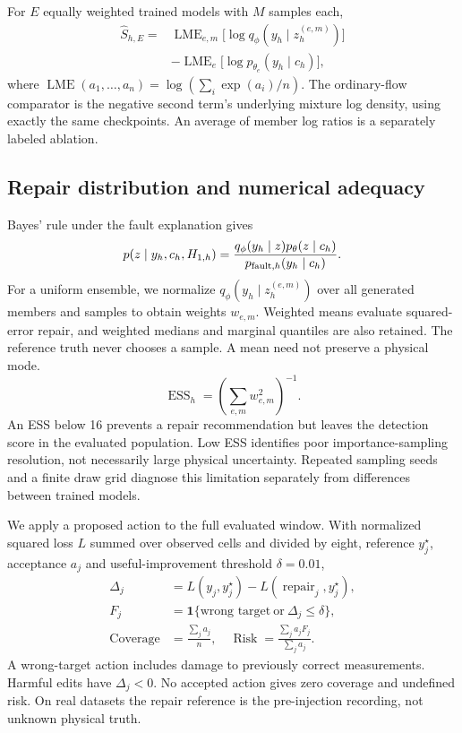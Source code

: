 \documentclass[conference]{IEEEtran}
\newcommand{\1}{\mathbf{1}}
\newcommand{\LME}{\operatorname{LME}}
\begin{document}
For $E$ equally weighted trained models with $M$ samples each,
\begin{equation}
\begin{split}
 \widehat S_{h,E}={}&\LME_{e,m}\bigl[\log q_\phi(y_h\mid z_h^{(e,m)})\bigr]\\
 &-\LME_e\bigl[\log p_{\theta_e}(y_h\mid c_h)\bigr],
\end{split}
\end{equation}
where $\LME(a_1,\ldots,a_n)=\log(\sum_i\exp(a_i)/n)$. The ordinary-flow comparator is the negative second term's underlying mixture log density, using exactly the same checkpoints. An average of member log ratios is a separately labeled ablation.

\subsection{Repair distribution and numerical adequacy}
Bayes' rule under the fault explanation gives
\begin{equation}
 p(z\mid y_h,c_h,H_{1,h})=
 \frac{q_\phi(y_h\mid z)p_\theta(z\mid c_h)}{p_{{\rm fault},h}(y_h\mid c_h)}.
\end{equation}
For a uniform ensemble, we normalize $q_\phi(y_h\mid z_h^{(e,m)})$ over all generated members and samples to obtain weights $w_{e,m}$. Weighted means evaluate squared-error repair, and weighted medians and marginal quantiles are also retained. The reference truth never chooses a sample. A mean need not preserve a physical mode.
\begin{equation}
 \operatorname{ESS}_h=\left(\sum_{e,m}w_{e,m}^2\right)^{-1}.
\end{equation}
An ESS below 16 prevents a repair recommendation but leaves the detection score in the evaluated population. Low ESS identifies poor importance-sampling resolution, not necessarily large physical uncertainty. Repeated sampling seeds and a finite draw grid diagnose this limitation separately from differences between trained models.

We apply a proposed action to the full evaluated window. With normalized squared loss $L$ summed over observed cells and divided by eight, reference $y_j^\star$, acceptance $a_j$ and useful-improvement threshold $\delta=0.01$,
\begin{equation}
\begin{split}
 \Delta_j&=L(y_j,y_j^\star)-L(\operatorname{repair}_j,y_j^\star),\\
 F_j&=\1\{\text{wrong target}\ \text{or}\ \Delta_j\leq\delta\},\\
 \operatorname{Coverage}&=\frac{\sum_j a_j}{n},\quad
 \operatorname{Risk}=\frac{\sum_j a_jF_j}{\sum_j a_j}.
\end{split}
\end{equation}
A wrong-target action includes damage to previously correct measurements. Harmful edits have $\Delta_j<0$. No accepted action gives zero coverage and undefined risk. On real datasets the repair reference is the pre-injection recording, not unknown physical truth.
\end{document}
